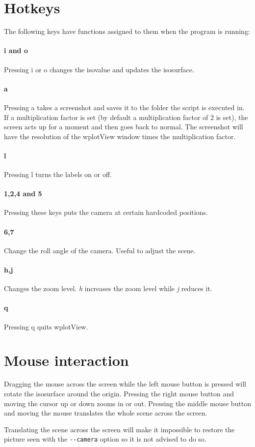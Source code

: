 \documentclass[12pt, parskip=full]{scrartcl}
\begin{document}
\section{Hotkeys} \label{sec:hotkeys}
The following keys have functions assigned to them when the program is running:
\paragraph{i and o} 
Pressing i or o changes the isovalue and updates the isosurface.
\paragraph{a}
Pressing a takes a screenshot and saves it to the folder the script is executed
in. If a multiplication factor is set (by default a multiplication factor of 2
is set), the screen acts up for a moment and then
goes back to normal. The screenshot will have the resolution of the wplotView
window times the multiplication factor.
\paragraph{l}
Pressing l turns the labels on or off.
\paragraph{1,2,4 and 5}
Pressing these keys puts the camera at certain hardcoded positions.
\paragraph{6,7}
Change the roll angle of the camera. Useful to adjust the scene.
\paragraph{h,j}
Changes the zoom level. \emph{h} increases the zoom level while \emph{j} 
reduces it.
\paragraph{q}
Pressing q quits wplotView.

\section{Mouse interaction}
Dragging the mouse across the screen while the left mouse button is pressed
will rotate the isosurface around the origin. Pressing the right mouse button
and moving the cursor up or down zooms in or out. Pressing the middle mouse
button and moving the mouse translates the whole scene across the screen.

Translating the scene across the screen will make it impossible to restore the
picture seen with the \verb+--camera+ option so it is not advised to do so.
\end{document}
